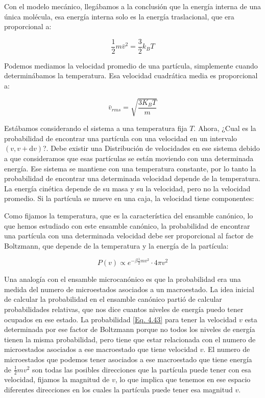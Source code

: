 \documentclass[11pt,fleqn]{book}
\begin{document}
Con el modelo mecánico, llegábamos a la conclusión que la energía interna de una única molécula, esa energía interna solo es la energía  traslacional, que era proporcional a:

\begin{equation*}
    \frac{1}{2}m\bar{v}^{2}=\frac{3}{2}k_{B}T
\end{equation*}

Podemos mediamos la velocidad promedio de una partícula, simplemente cuando determinábamos la temperatura. Esa velocidad cuadrática media es proporcional a:

\begin{equation*}
    \bar{v}_{rms}=\sqrt{\frac{3K_{B}T}{m}}
\end{equation*}

Estábamos considerando el sistema a una temperatura fija $T$. Ahora, ¿Cual es la probabilidad de encontrar una partícula con una velocidad en un intervalo $(v,v+\mathrm{d}v)$?. Debe existir una Distribución de velocidades en ese sistema debido a que consideramos que esas partículas se están moviendo con una determinada energía. Ese sistema se mantiene con una temperatura constante, por lo tanto la probabilidad de encontrar una determinada velocidad depende de la temperatura. La energía cinética depende de su masa y su la velocidad, pero no la velocidad promedio. Si la partícula se mueve en una caja, la velocidad tiene componentes:


Como fijamos la temperatura, que es la característica del ensamble canónico, lo que hemos estudiado con este ensamble canónico, la probabilidad de encontrar una partícula con una determinada velocidad debe ser proporcional al factor de Boltzmann, que depende de la temperatura y la energía de la partícula:

\begin{equation}
    P(v)\propto e^{-\beta\frac{1}{2}mv^{2}}\cdot4\pi v^{2}
    \label{Eq. 4.43}
\end{equation}

Una analogía con el ensamble microcanónico es que la probabilidad era una medida del numero de microestados asociados a un macroestado. La idea inicial de calcular la probabilidad en el ensamble canónico partió de calcular probabilidades relativas, que nos dice cuantos niveles de energía puedo tener ocupados en ese estado. La probabilidad \ref{Eq. 4.43} para tener la velocidad $v$ esta determinada por ese factor de Boltzmann porque no todos los niveles de energía tienen la misma probabilidad, pero tiene que estar relacionada con el numero de microestados asociados a ese macroestado que tiene velocidad $v$. El numero de microestados que podemos tener asociados a ese macroestado que tiene energía de $\frac{1}{2}mv^{2}$ son todas las posibles direcciones que la partícula puede tener con esa velocidad, fijamos la magnitud de $v$, lo que implica que tenemos en ese espacio diferentes direcciones en los cuales la partícula puede tener esa magnitud $v$.
\end{document}
